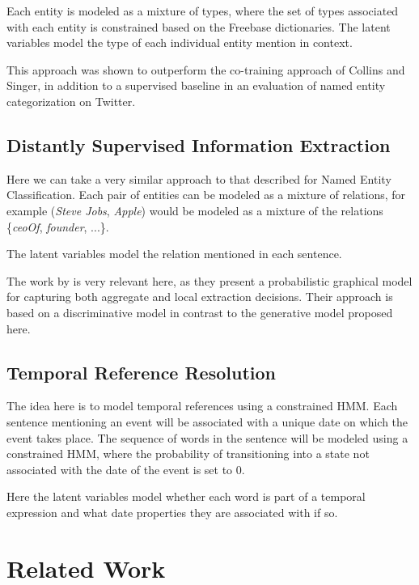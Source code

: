 \documentclass[12pt]{article}
\begin{document}
Each entity is modeled as a mixture of types, where the set of types associated with each entity is constrained based on the Freebase dictionaries.
The latent variables model the type of each individual entity mention in context.

This approach was shown to outperform the co-training approach of Collins and Singer, in addition to a supervised baseline in an evaluation
of named entity categorization on Twitter.

\subsection{Distantly Supervised Information Extraction}
Here we can take a very similar approach to that described for Named Entity Classification.  Each pair of entities can be modeled
as a mixture of relations, for example (\emph{Steve Jobs}, \emph{Apple}) would be modeled as a mixture of the relations 
\{{\sl ceoOf}, {\sl founder}, ...\}.

The latent variables model the relation mentioned in each sentence.

The work by \cite{Hoffmann11} is very relevant here, as they present a probabilistic graphical model for capturing
both aggregate and local extraction decisions.  Their approach is based on a discriminative model in contrast to the generative model
proposed here.

\subsection{Temporal Reference Resolution}
The idea here is to model temporal references using a constrained HMM.  Each sentence mentioning an event will be associated with a unique date
on which the event takes place.  The sequence of words in the sentence will be modeled using a constrained HMM, where the probability of transitioning
into a state not associated with the date of the event is set to 0.

Here the latent variables model whether each word is part of a temporal expression and what date properties they are associated with if so.

\section{Related Work}



\end{document}
